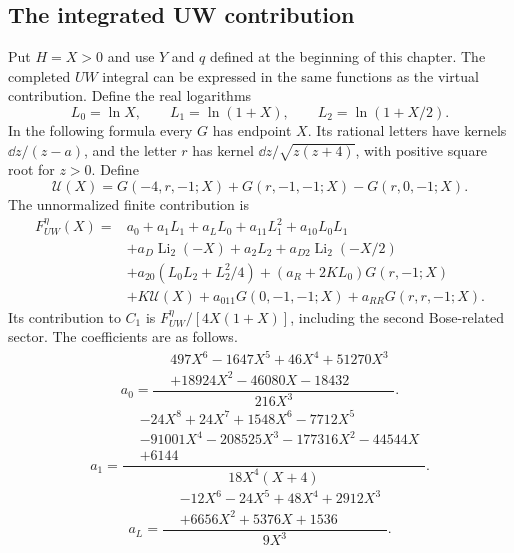 \subsection{The integrated UW contribution}
Put $H=X>0$ and use $Y$ and $q$ defined at the beginning of this chapter. The completed $UW$ integral can be expressed in the same functions as the virtual contribution. Define the real logarithms
\begin{equation} L_0=\ln X,\qquad L_1=\ln(1+X),\qquad L_2=\ln(1+X/2).\end{equation}
In the following formula every $G$ has endpoint $X$. Its rational letters have kernels $\dd z/(z-a)$, and the letter $r$ has kernel $\dd z/\sqrt{z(z+4)}$, with positive square root for $z>0$. Define
\begin{equation} \mathcal U(X)=G(-4,r,-1;X)+G(r,-1,-1;X)-G(r,0,-1;X).\end{equation}
The unnormalized finite contribution is
\begin{equation}\begin{aligned}
 F_{UW}^{\eta}(X)={}&a_0+a_1L_1+a_LL_0+a_{11}L_1^2+a_{10}L_0L_1\\
 &+a_D\operatorname{Li}_2(-X)+a_2L_2+a_{D2}\operatorname{Li}_2(-X/2)\\
 &+a_{20}(L_0L_2+L_2^2/4)+(a_R+2KL_0)G(r,-1;X)\\
 &+K\mathcal U(X)+a_{011}G(0,-1,-1;X)+a_{RR}G(r,r,-1;X).
\end{aligned}\label{eq:comp-uw-integrated-compact}\end{equation}
Its contribution to $C_1$ is $F_{UW}^{\eta}/[4X(1+X)]$, including the second Bose-related sector. The coefficients are as follows.
\begin{equation}
a_0=\frac{\begin{aligned}&497 X^{6} - 1647 X^{5} + 46 X^{4} + 51270 X^{3}\\&+18924 X^{2} - 46080 X - 18432\end{aligned}}{216 X^{3}}.
\end{equation}
\begin{equation}
a_1=\frac{\begin{aligned}&- 24 X^{8} + 24 X^{7} + 1548 X^{6} - 7712 X^{5}\\&- 91001 X^{4} - 208525 X^{3} - 177316 X^{2} - 44544 X\\&+6144\end{aligned}}{18 X^{4} \left(X + 4\right)}.
\end{equation}
\begin{equation}
a_L=\frac{\begin{aligned}&- 12 X^{6} - 24 X^{5} + 48 X^{4} + 2912 X^{3}\\&+6656 X^{2} + 5376 X + 1536\end{aligned}}{9 X^{3}}.
\end{equation}
